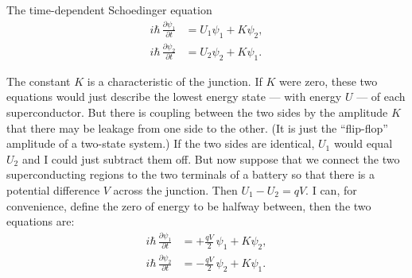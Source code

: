 \documentclass[a4paper,11pt]{article}
\newcommand{\ddp}[2]{\frac{\partial #1}{\partial #2 }}
\begin{document}
The time-dependent Schoedinger equation 
\begin{align}
i\hbar\,\ddp{\psi_1}{t}&=U_1\psi_1+K\psi_2,\\
i\hbar\,\ddp{\psi_2}{t}&=U_2\psi_2+K\psi_1.
\end{align}

The constant $K$ is a characteristic of the junction. If $K$ were zero, these two equations would just describe the lowest energy state — with energy $U$ — of each superconductor. But there is coupling between the two sides by the amplitude $K$ that there may be leakage from one side to the other. (It is just the “flip-flop” amplitude of a two-state system.) If the two sides are identical, $U_1$ would equal $U_2$ and I could just subtract them off. But now suppose that we connect the two superconducting regions to the two terminals of a battery so that there is a potential difference $V$ across the junction. Then $U_1 - U_2=qV$. I can, for convenience, define the zero of energy to be halfway between, then the two equations are:
\begin{equation}
\begin{aligned}
i\hbar\,\ddp{\psi_1}{t}&=+\frac{qV}{2}\,\psi_1+K\psi_2,\\
i\hbar\,\ddp{\psi_2}{t}&=-\frac{qV}{2}\,\psi_2+K\psi_1.
\end{aligned}
\label{eq:josephson_system}
\end{equation}
\end{document}
